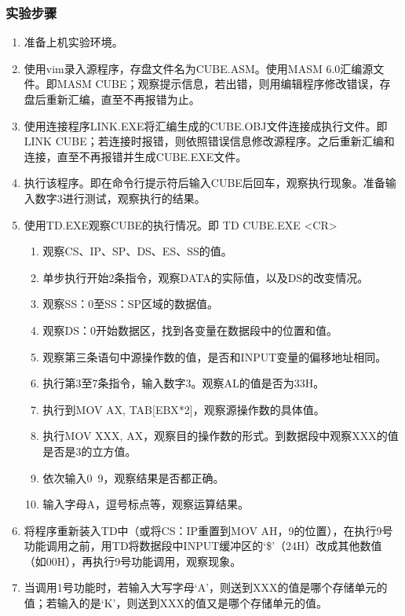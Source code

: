 \documentclass{article}
\begin{document}
	\subsubsection{实验步骤}
	\begin{enumerate}
		\item 准备上机实验环境。
		\item 使用vim录入源程序，存盘文件名为CUBE.ASM。使用MASM 6.0汇编源文件。即MASM CUBE；观察提示信息，若出错，则用编辑程序修改错误，存盘后重新汇编，直至不再报错为止。
		\item 使用连接程序LINK.EXE将汇编生成的CUBE.OBJ文件连接成执行文件。即LINK CUBE；若连接时报错，则依照错误信息修改源程序。之后重新汇编和连接，直至不再报错并生成CUBE.EXE文件。
		\item 执行该程序。即在命令行提示符后输入CUBE后回车，观察执行现象。准备输入数字3进行测试，观察执行的结果。
		\item 使用TD.EXE观察CUBE的执行情况。即 TD  CUBE.EXE <CR>
			\begin{enumerate}
				\item 观察CS、IP、SP、DS、ES、SS的值。
				\item 单步执行开始2条指令，观察DATA的实际值，以及DS的改变情况。
				\item 观察SS：0至SS：SP区域的数据值。
				\item 观察DS：0开始数据区，找到各变量在数据段中的位置和值。
				\item 观察第三条语句中源操作数的值，是否和INPUT变量的偏移地址相同。
				\item 执行第3至7条指令，输入数字3。观察AL的值是否为33H。
				\item 执行到MOV  AX, TAB[EBX*2]，观察源操作数的具体值。
				\item 执行MOV  XXX, AX，观察目的操作数的形式。到数据段中观察XXX的值是否是3的立方值。
				\item 依次输入0~9，观察结果是否都正确。
				\item 输入字母A，逗号标点等，观察运算结果。
			\end{enumerate}
		\item 将程序重新装入TD中（或将CS：IP重置到MOV AH，9的位置），在执行9号功能调用之前，用TD将数据段中INPUT缓冲区的‘\$’（24H）改成其他数值（如00H），再执行9号功能调用，观察现象。
		\item 当调用1号功能时，若输入大写字母‘A’，则送到XXX的值是哪个存储单元的值；若输入的是‘K’，则送到XXX的值又是哪个存储单元的值。
	\end{enumerate}
\end{document}
